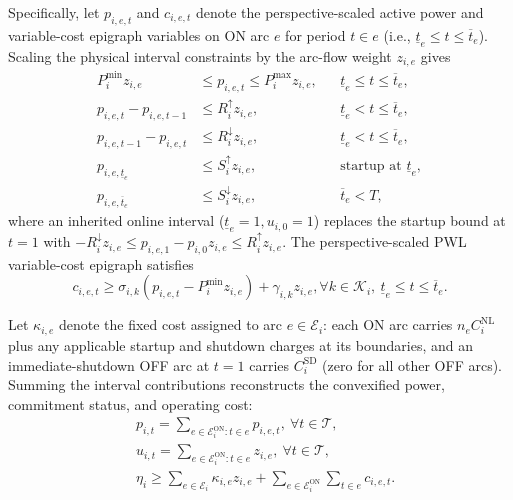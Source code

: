 \documentclass[journal]{IEEEtran}
\newcommand{\Pmin}{P^{\min}}
\newcommand{\Pmax}{P^{\max}}
\newcommand{\Rup}{R^{\uparrow}}
\newcommand{\Rdn}{R^{\downarrow}}
\newcommand{\Sup}{S^{\uparrow}}
\newcommand{\Sdn}{S^{\downarrow}}
\begin{document}
Specifically, let $p_{i,e,t}$ and $c_{i,e,t}$ denote the perspective-scaled active power and variable-cost epigraph variables on ON arc $e$ for period $t\in e$ (i.e., $\underline{t}_e\le t\le\overline{t}_e$). Scaling the physical interval constraints by the arc-flow weight $z_{i,e}$ gives
\begin{subequations}\label{eq:interval}
\begin{align}
\Pmin_i z_{i,e} &\le p_{i,e,t}\le\Pmax_i z_{i,e}, && \underline{t}_e\le t\le\overline{t}_e,\\
p_{i,e,t}-p_{i,e,t-1} &\le \Rup_i z_{i,e}, && \underline{t}_e<t\le\overline{t}_e,\\
p_{i,e,t-1}-p_{i,e,t} &\le \Rdn_i z_{i,e}, && \underline{t}_e<t\le\overline{t}_e,\\
p_{i,e,\underline{t}_e} &\le \Sup_i z_{i,e}, && \text{startup at }\underline{t}_e,\\
p_{i,e,\overline{t}_e} &\le \Sdn_i z_{i,e}, && \overline{t}_e<T,
\end{align}
\end{subequations}
where an inherited online interval ($\underline{t}_e=1,u_{i,0}=1$) replaces the startup bound at $t=1$ with $-\Rdn_i z_{i,e}\le p_{i,e,1}-p_{i,0}z_{i,e}\le\Rup_i z_{i,e}$. The perspective-scaled PWL variable-cost epigraph satisfies
\begin{equation}
\!\!\!\!c_{i,e,t}\!\! \ge\!\! \sigma_{i,k}\!\left(p_{i,e,t}\!\!-\!\!\Pmin_i z_{i,e}\right) \!\!+\!\! \gamma_{i,k}z_{i,e},  \forall k\!\!\in\!\!\mathcal{K}_i,\ \underline{t}_e\!\!\le\!\! t\!\!\le\!\!\overline{t}_e.\label{eq:perspective}
\end{equation}

Let $\kappa_{i,e}$ denote the fixed cost assigned to arc $e\in\mathcal{E}_i$: each ON arc carries $n_e C_i^{\mathrm{NL}}$ plus any applicable startup and shutdown charges at its boundaries, and an immediate-shutdown OFF arc at $t=1$ carries $C_i^{\mathrm{SD}}$ (zero for all other OFF arcs). Summing the interval contributions reconstructs the convexified power, commitment status, and operating cost:
\begin{subequations}\label{eq:aggregation}
\begin{align}
&p_{i,t} = \sum\nolimits_{e\in\mathcal{E}_i^{\mathrm{ON}}:t\in e} p_{i,e,t}, \ \forall t\in\mathcal{T},\label{eq:agg-power}\\
&u_{i,t} = \sum\nolimits_{e\in\mathcal{E}_i^{\mathrm{ON}}:t\in e} z_{i,e}, \ \forall t\in\mathcal{T},\label{eq:agg-status}\\
&\eta_i \!\!\ge\!\! \sum\nolimits_{e\in\mathcal{E}_i}\kappa_{i,e}z_{i,e}
\!\!+\!\! \sum\nolimits_{e\in\mathcal{E}_i^{\mathrm{ON}}}\sum\nolimits_{t\in e}c_{i,e,t}.\label{eq:agg-cost}
\end{align}
\end{subequations}
\end{document}
